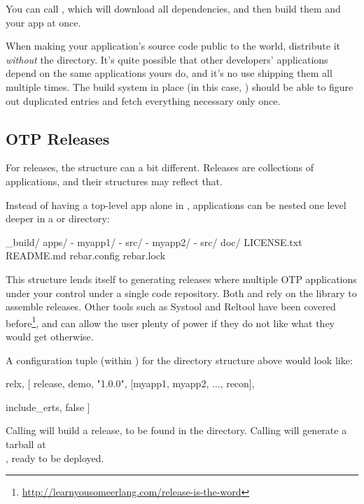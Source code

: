 You can call , which will download all dependencies, and then build them and your app at once.

When making your application's source code public to the world, distribute it \emph{without} the  directory. It's quite possible that other developers' applications depend on the same applications yours do, and it's no use shipping them all multiple times. The build system in place (in this case, ) should be able to figure out duplicated entries and fetch everything necessary only once.

\subsection{OTP Releases}
\label{subsec:building-otp-releases}

For releases, the structure can a bit different. Releases are collections of applications, and their structures may reflect that.

Instead of having a top-level app alone in , applications can be nested one level deeper in a  or  directory:

\begin{VerbatimRaw}
_build/
apps/
  - myapp1/
     - src/
  - myapp2/
     - src/
doc/
LICENSE.txt
README.md
rebar.config
rebar.lock
\end{VerbatimRaw}

This structure lends itself to generating releases where multiple OTP applications under your control under a single code repository. Both  and  rely on the  library to assemble releases. Other tools such as Systool and Reltool have been covered before\footnote{\href{http://learnyousomeerlang.com/release-is-the-word}{http://learnyousomeerlang.com/release-is-the-word}}, and can allow the user plenty of power if they do not like what they would get otherwise.

A  configuration tuple (within ) for the directory structure above would look like:

\begin{VerbatimText}
{relx, [
  {release, {demo, "1.0.0"},
    [myapp1, myapp2, ..., recon]},
     
  {include_erts, false} %
]}
\end{VerbatimText}

Calling  will build a release, to be found in the  directory. Calling  will generate a tarball at\\
, ready to be deployed.

